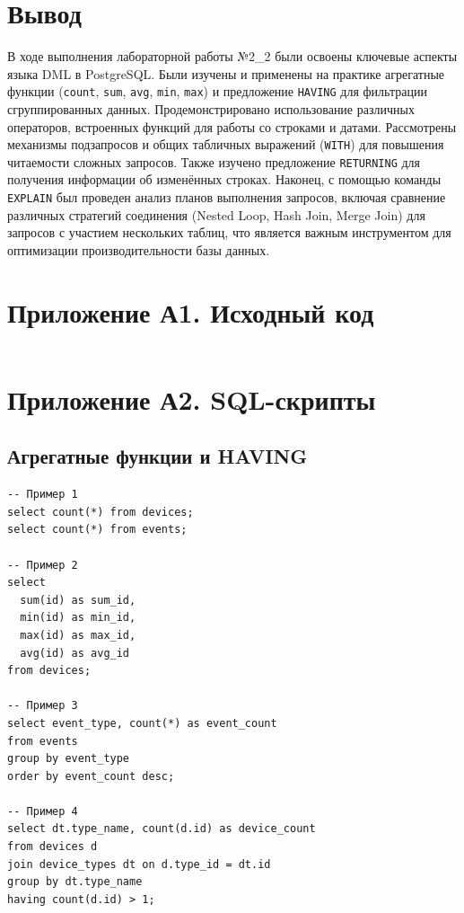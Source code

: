 \documentclass[oneside,a4paper,14pt]{extarticle}
\begin{document}
\clearpage
\section*{Вывод}

В ходе выполнения лабораторной работы №2\_2 были освоены ключевые аспекты языка DML в PostgreSQL. Были изучены и применены на практике агрегатные функции (\texttt{count}, \texttt{sum}, \texttt{avg}, \texttt{min}, \texttt{max}) и предложение \texttt{HAVING} для фильтрации сгруппированных данных. Продемонстрировано использование различных операторов, встроенных функций для работы со строками и датами. Рассмотрены механизмы подзапросов и общих табличных выражений (\texttt{WITH}) для повышения читаемости сложных запросов. Также изучено предложение \texttt{RETURNING} для получения информации об изменённых строках. Наконец, с помощью команды \texttt{EXPLAIN} был проведен анализ планов выполнения запросов, включая сравнение различных стратегий соединения (Nested Loop, Hash Join, Merge Join) для запросов с участием нескольких таблиц, что является важным инструментом для оптимизации производительности базы данных.
\newpage


\section*{Приложение А1. Исходный код}
\inputminted{Dockerfile}{../Containerfile}

\section*{Приложение А2. SQL-скрипты}

\subsection*{Агрегатные функции и HAVING}
\begin{verbatim}
-- Пример 1
select count(*) from devices;
select count(*) from events;

-- Пример 2
select 
  sum(id) as sum_id,
  min(id) as min_id, 
  max(id) as max_id, 
  avg(id) as avg_id
from devices;

-- Пример 3
select event_type, count(*) as event_count
from events
group by event_type
order by event_count desc;

-- Пример 4
select dt.type_name, count(d.id) as device_count
from devices d
join device_types dt on d.type_id = dt.id
group by dt.type_name
having count(d.id) > 1;
\end{verbatim}
\end{document}
